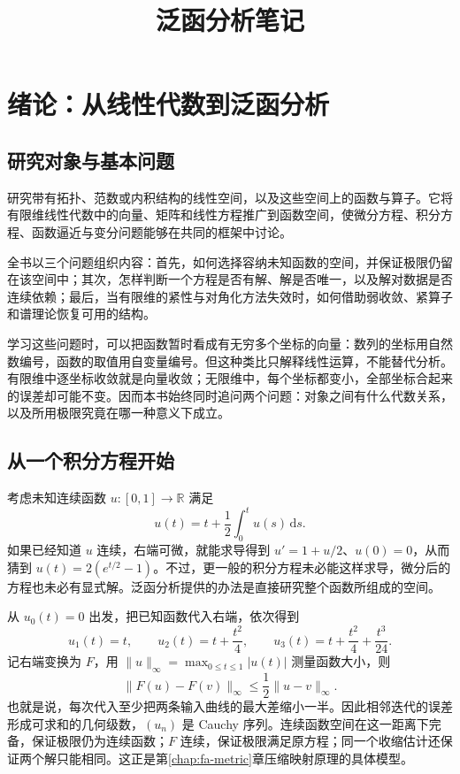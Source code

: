 \documentclass[UTF8,12pt,a4paper,fontset=fandol]{ctexbook}
\title{泛函分析笔记}
\author{}
\date{}
\begin{document}
\maketitle
\tableofcontents

\chapter{绪论：从线性代数到泛函分析}
\label{chap:fa-introduction}

\section{研究对象与基本问题}

研究带有拓扑、范数或内积结构的线性空间，以及这些空间上的函数与算子。它将有限维线性代数中的向量、矩阵和线性方程推广到函数空间，使微分方程、积分方程、函数逼近与变分问题能够在共同的框架中讨论。

全书以三个问题组织内容：首先，如何选择容纳未知函数的空间，并保证极限仍留在该空间中；其次，怎样判断一个方程是否有解、解是否唯一，以及解对数据是否连续依赖；最后，当有限维的紧性与对角化方法失效时，如何借助弱收敛、紧算子和谱理论恢复可用的结构。

学习这些问题时，可以把函数暂时看成有无穷多个坐标的向量：数列的坐标用自然数编号，函数的取值用自变量编号。但这种类比只解释线性运算，不能替代分析。有限维中逐坐标收敛就是向量收敛；无限维中，每个坐标都变小，全部坐标合起来的误差却可能不变。因而本书始终同时追问两个问题：对象之间有什么代数关系，以及所用极限究竟在哪一种意义下成立。

\section{从一个积分方程开始}
考虑未知连续函数 $u:[0,1]\to\mathbb R$ 满足
\begin{equation}
 u(t)=t+\frac12\int_0^t u(s)\,\mathrm ds.
 \label{eq:fa-intro-integral}
\end{equation}
如果已经知道 $u$ 连续，右端可微，就能求导得到 $u'=1+u/2$、$u(0)=0$，从而猜到 $u(t)=2(e^{t/2}-1)$。不过，更一般的积分方程未必能这样求导，微分后的方程也未必有显式解。泛函分析提供的办法是直接研究整个函数所组成的空间。

从 $u_0(t)=0$ 出发，把已知函数代入右端，依次得到
\[
 u_1(t)=t,\qquad u_2(t)=t+\frac{t^2}{4},\qquad
 u_3(t)=t+\frac{t^2}{4}+\frac{t^3}{24}.
\]
记右端变换为 $F$，用 $\|u\|_\infty=\max_{0\leq t\leq1}|u(t)|$ 测量函数大小，则
\[
 \|F(u)-F(v)\|_\infty
 \leq\frac12\|u-v\|_\infty.
\]
也就是说，每次代入至少把两条输入曲线的最大差缩小一半。因此相邻迭代的误差形成可求和的几何级数，$(u_n)$ 是 Cauchy 序列。连续函数空间在这一距离下完备，保证极限仍为连续函数；$F$ 连续，保证极限满足原方程；同一个收缩估计还保证两个解只能相同。这正是第\ref{chap:fa-metric}章压缩映射原理的具体模型。
\end{document}
